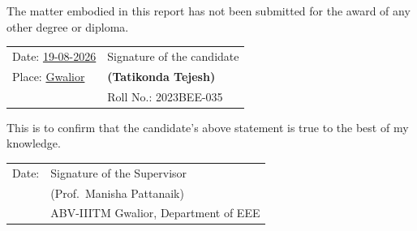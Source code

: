 \documentclass[12pt, a4paper]{report}
\begin{document}
The matter embodied in this report has not been submitted for the award of any other degree or diploma.

\vspace{2cm}

\noindent
\begin{tabular}{ll}
Date: \underline{19-08-2026\hspace{1cm}} & \hspace{4cm} Signature of the candidate \\
Place: \underline{Gwalior\hspace{1.5cm}} & \hspace{4cm} \textbf{(Tatikonda Tejesh)} \\
                                         & \hspace{4cm} Roll No.: 2023BEE-035 \\
\end{tabular}

\vspace{2cm}

\noindent
This is to confirm that the candidate's above statement is true to the best of my knowledge.

\vspace{1.5cm}

\noindent
\begin{tabular}{ll}
Date: \underline{\hspace{3cm}} & \hspace{4cm} Signature of the Supervisor \\
               & \hspace{4cm} (Prof.\ Manisha Pattanaik) \\
               & \hspace{4cm} ABV-IIITM Gwalior, Department of EEE \\
\end{tabular}


\end{document}
